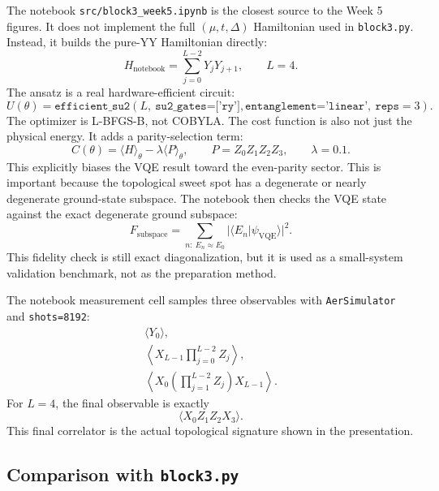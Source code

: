\documentclass[11pt]{article}
\begin{document}
The notebook \texttt{src/block3\_week5.ipynb} is the closest source to the Week
5 figures. It does not implement the full $(\mu,t,\Delta)$ Hamiltonian used in
\texttt{block3.py}. Instead, it builds the pure-YY Hamiltonian directly:
\begin{equation}
  H_{\mathrm{notebook}} = \sum_{j=0}^{L-2} Y_jY_{j+1},
  \qquad L=4.
\end{equation}
The ansatz is a real hardware-efficient circuit:
\begin{equation}
  U(\theta)=\texttt{efficient\_su2}(L,\ \texttt{su2\_gates=['ry']},
  \texttt{entanglement='linear'},\ \texttt{reps}=3).
\end{equation}
The optimizer is L-BFGS-B, not COBYLA. The cost function is also not just the
physical energy. It adds a parity-selection term:
\begin{equation}
  C(\theta)=\langle H\rangle_\theta-\lambda\langle P\rangle_\theta,
  \qquad
  P=Z_0Z_1Z_2Z_3,\qquad \lambda=0.1.
\end{equation}
This explicitly biases the VQE result toward the even-parity sector. This is
important because the topological sweet spot has a degenerate or nearly
degenerate ground-state subspace. The notebook then checks the VQE state against
the exact degenerate ground subspace:
\begin{equation}
  F_{\mathrm{subspace}}
  = \sum_{n:\ E_n\approx E_0} |\langle E_n|\psi_{\mathrm{VQE}}\rangle|^2.
\end{equation}
This fidelity check is still exact diagonalization, but it is used as a
small-system validation benchmark, not as the preparation method.

The notebook measurement cell samples three observables with
\texttt{AerSimulator} and \texttt{shots=8192}:
\begin{align}
  \langle Y_0\rangle,\\
  \left\langle X_{L-1}\prod_{j=0}^{L-2}Z_j\right\rangle,\\
  \left\langle X_0\left(\prod_{j=1}^{L-2}Z_j\right)X_{L-1}\right\rangle.
\end{align}
For $L=4$, the final observable is exactly
\begin{equation}
  \langle X_0Z_1Z_2X_3\rangle.
\end{equation}
This final correlator is the actual topological signature shown in the
presentation.

\subsection{Comparison with \texttt{block3.py}}
\end{document}
